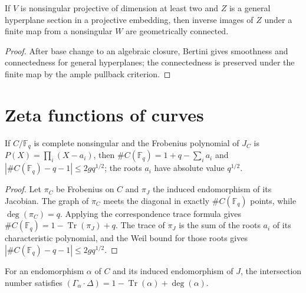 \begin{lemma}
\label{lem:milne-general-projection-fibres-source}

If $V$ is nonsingular projective of dimension at least two and $Z$ is a
general hyperplane section in a projective embedding, then inverse images of
$Z$ under a finite map from a nonsingular $W$ are geometrically connected.
\end{lemma}

\begin{proof}

After base change to an algebraic closure, Bertini gives smoothness and
connectedness for general hyperplanes; the connectedness is preserved under
the finite map by the ample pullback criterion.

\end{proof}


\section{Zeta functions of curves}
\begin{theorem}
\label{thm:milne-curve-point-count-source}

If $C/\mathbb F_q$ is complete nonsingular and the Frobenius polynomial of
$J_C$ is $P(X)=\prod_i(X-a_i)$, then
$\#C(\mathbb F_q)=1+q-\sum_i a_i$ and
$|\#C(\mathbb F_q)-q-1|\le 2gq^{1/2}$; the roots $a_i$ have absolute value
$q^{1/2}$.
\end{theorem}

\begin{proof}

Let $\pi_C$ be Frobenius on $C$ and $\pi_J$ the induced endomorphism of its
Jacobian.  The graph of $\pi_C$ meets the diagonal in exactly
$\#C(\mathbb F_q)$ points, while $\deg(\pi_C)=q$.  Applying the correspondence
trace formula gives
$\#C(\mathbb F_q)=1-\operatorname{Tr}(\pi_J)+q$.  The trace of $\pi_J$ is
the sum of the roots $a_i$ of its characteristic polynomial, and the Weil
bound for those roots gives
$|\#C(\mathbb F_q)-q-1|\le2gq^{1/2}$.

\end{proof}


\begin{proposition}
\label{prop:milne-correspondence-trace-source}

For an endomorphism $\alpha$ of $C$ and its induced endomorphism of $J$,
the intersection number satisfies $(\Gamma_\alpha\cdot\Delta)=1-\operatorname{Tr}(\alpha)+\deg(\alpha)$.
\end{proposition}


